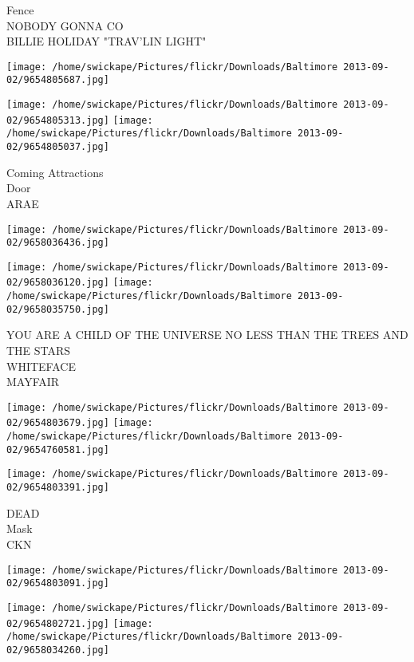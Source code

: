\documentclass[10pt,letterpaper]{article}
\begin{document}
Fence\\
NOBODY GONNA CO\\
BILLIE HOLIDAY "TRAV'LIN LIGHT"\\
\pagebreak

\texttt{[image: /home/swickape/Pictures/flickr/Downloads/Baltimore 2013-09-02/9654805687.jpg]}

\vspace{0.25in}
\texttt{[image: /home/swickape/Pictures/flickr/Downloads/Baltimore 2013-09-02/9654805313.jpg]}
\texttt{[image: /home/swickape/Pictures/flickr/Downloads/Baltimore 2013-09-02/9654805037.jpg]}

Coming Attractions\\
Door\\
ARAE\\
\pagebreak

\texttt{[image: /home/swickape/Pictures/flickr/Downloads/Baltimore 2013-09-02/9658036436.jpg]}

\vspace{0.25in}
\texttt{[image: /home/swickape/Pictures/flickr/Downloads/Baltimore 2013-09-02/9658036120.jpg]}
\texttt{[image: /home/swickape/Pictures/flickr/Downloads/Baltimore 2013-09-02/9658035750.jpg]}

YOU ARE A CHILD OF THE UNIVERSE NO LESS THAN THE TREES AND THE STARS\\
WHITEFACE\\
MAYFAIR\\
\pagebreak

\texttt{[image: /home/swickape/Pictures/flickr/Downloads/Baltimore 2013-09-02/9654803679.jpg]}
\texttt{[image: /home/swickape/Pictures/flickr/Downloads/Baltimore 2013-09-02/9654760581.jpg]}

\vspace{0.25in}
\texttt{[image: /home/swickape/Pictures/flickr/Downloads/Baltimore 2013-09-02/9654803391.jpg]}

DEAD\\
Mask\\
CKN\\
\pagebreak

\texttt{[image: /home/swickape/Pictures/flickr/Downloads/Baltimore 2013-09-02/9654803091.jpg]}

\vspace{0.25in}
\texttt{[image: /home/swickape/Pictures/flickr/Downloads/Baltimore 2013-09-02/9654802721.jpg]}
\texttt{[image: /home/swickape/Pictures/flickr/Downloads/Baltimore 2013-09-02/9658034260.jpg]}
\end{document}
